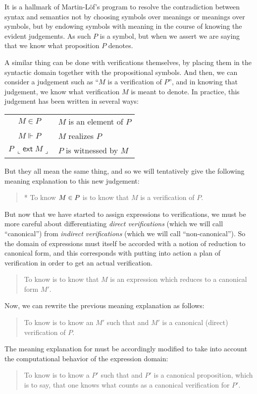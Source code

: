 \documentclass[main.tex]{subfiles}
\begin{document}
It is a hallmark of Martin-L\"of's program to resolve the contradiction between
syntax and semantics not by choosing symbols over meanings or meanings over
symbols, but by endowing symbols with meaning in the course of knowing the
evident judgements. As such $P$ is a symbol, but when we assert  we
are saying that we know what proposition $P$ denotes.

A similar thing can be done with verifications themselves, by placing them in
the syntactic domain together with the propositional symbols. And then, we can
consider a judgement such as ``$M$ is a verification of $P$'', and in knowing
that judgement, we know what verification $M$ is meant to denote. In practice,
this judgement has been written in several ways:\\\medskip
\begin{tabular}{c|l}
  $M\in P$ & $M$ is an element of $P$\\
  $M\Vdash P$ & $M$ realizes $P$\\
  $P\ \llcorner\mathsf{ext}\; M\lrcorner$ & $P$ is witnessed by $M$
\end{tabular}

But they all mean the same thing, and so we will tentatively give the following
meaning explanation to this new judgement:
\begin{quote}
  * To know $M\in P$ is to know that $M$ is a verification of $P$.
\end{quote}

But now that we have started to assign expressions to verifications, we must be
more careful about differentiating \emph{direct verifications} (which we will
call ``canonical'') from \emph{indirect verifications} (which we will call
``non-canonical''). So the domain of expressions must itself be accorded with a
notion of reduction to canonical form, and this corresponds with putting into
action a plan of verification in order to get an actual verification.
\begin{quote}
  To know  is to know that $M$ is an expression which reduces to
  a canonical form $M'$.
\end{quote}

Now, we can rewrite the previous meaning explanation as follows:
\begin{quote}
  To know  is to know an $M'$ such that  and $M'$ is a
  canonical (direct) verification of $P$.
\end{quote}

The meaning explanation for  must be accordingly modified to take
into account the computational behavior of the expression domain:
\begin{quote}
  To know  is to know a $P'$ such that  and $P'$ is a
  canonical proposition, which is to say, that one knows what counts as a
  canonical verification for $P'$.
\end{quote}
\end{document}
